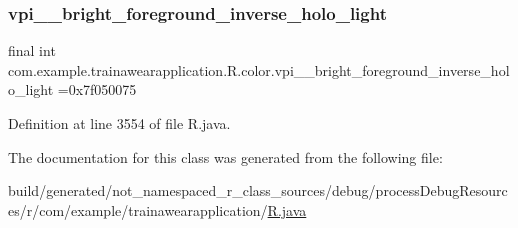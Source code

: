 \subsubsection{\texorpdfstring{vpi\_\_bright\_foreground\_inverse\_holo\_light}{vpi\_\_bright\_foreground\_inverse\_holo\_light}}
{\footnotesize\ttfamily final int com.\+example.\+trainawearapplication.\+R.\+color.\+vpi\+\_\+\+\_\+bright\+\_\+foreground\+\_\+inverse\+\_\+holo\+\_\+light =0x7f050075\hspace{0.3cm}{\ttfamily [static]}}



Definition at line 3554 of file R.\+java.



The documentation for this class was generated from the following file\+:\begin{DoxyCompactItemize}
\item 
build/generated/not\+\_\+namespaced\+\_\+r\+\_\+class\+\_\+sources/debug/process\+Debug\+Resources/r/com/example/trainawearapplication/\mbox{\hyperlink{com_2example_2trainawearapplication_2_r_8java}{R.\+java}}\end{DoxyCompactItemize}
